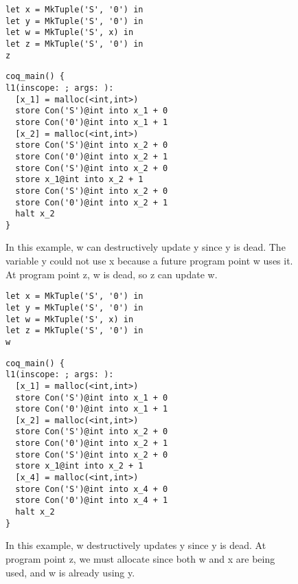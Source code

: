 \documentclass{article}
\begin{document}
\begin{figure}
\centering
\begin{minipage}[t]{.4\textwidth}
\begin{lstlisting}
let x = MkTuple('S', '0') in
let y = MkTuple('S', '0') in
let w = MkTuple('S', x) in
let z = MkTuple('S', '0') in
z
\end{lstlisting}
\end{minipage}
\hspace{20pt}
\begin{minipage}[t]{.4\textwidth}
\begin{lstlisting}
coq_main() {
l1(inscope: ; args: ):
  [x_1] = malloc(<int,int>)
  store Con('S')@int into x_1 + 0
  store Con('0')@int into x_1 + 1
  [x_2] = malloc(<int,int>)
  store Con('S')@int into x_2 + 0
  store Con('0')@int into x_2 + 1
  store Con('S')@int into x_2 + 0
  store x_1@int into x_2 + 1
  store Con('S')@int into x_2 + 0
  store Con('0')@int into x_2 + 1
  halt x_2
}
\end{lstlisting}
\end{minipage}
\caption{In this example, w can destructively update y since y is
  dead. The variable y could not use x because a future program point
  w uses it. At program point z, w is dead, so z can update w. }
\label{fig:dupdate2}
\end{figure}

\begin{figure}
\centering
\begin{minipage}[t]{.4\textwidth}
\begin{lstlisting}
let x = MkTuple('S', '0') in
let y = MkTuple('S', '0') in
let w = MkTuple('S', x) in
let z = MkTuple('S', '0') in
w
\end{lstlisting}
\end{minipage}
\hspace{20pt}
\begin{minipage}[t]{.4\textwidth}
\begin{lstlisting}
coq_main() {
l1(inscope: ; args: ):
  [x_1] = malloc(<int,int>)
  store Con('S')@int into x_1 + 0
  store Con('0')@int into x_1 + 1
  [x_2] = malloc(<int,int>)
  store Con('S')@int into x_2 + 0
  store Con('0')@int into x_2 + 1
  store Con('S')@int into x_2 + 0
  store x_1@int into x_2 + 1
  [x_4] = malloc(<int,int>)
  store Con('S')@int into x_4 + 0
  store Con('0')@int into x_4 + 1
  halt x_2
}
\end{lstlisting}
\end{minipage}
\caption{In this example, w destructively updates y since y is
  dead. At program point z, we must allocate since both w and x are
  being used, and w is already using y. }
\label{fig:dupdate3}
\end{figure}
\end{document}
